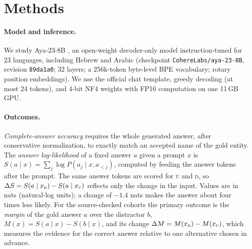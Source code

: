 \documentclass[11pt]{article}
\newcommand{\U}{\textsc{u}}
\newcommand{\D}{\textsc{d}}
\begin{document}
\section{Methods}
\label{sec:methods}

\paragraph{Model and inference.}
We study Aya-23-8B \citep{aryabumi-etal-2024-aya23}, an open-weight decoder-only
model instruction-tuned for 23 languages, including Hebrew and Arabic
(checkpoint \texttt{CohereLabs/aya-23-8B}, revision \texttt{89da1a0}; 32 layers;
a 256k-token byte-level BPE vocabulary; rotary position embeddings). We use the official chat template, greedy decoding (at most 24 tokens), and 4-bit NF4 weights with FP16 computation
\citep{dettmers-etal-2023-qlora} on one 11\,GB GPU.

\paragraph{Outcomes.}
\emph{Complete-answer accuracy} requires the whole generated answer, after
conservative normalization, to exactly match an accepted name of the gold
entity. The
\emph{answer log-likelihood} of a fixed answer $a$ given a prompt $x$ is
$S(a\mid x)=\sum_{j}\log P(a_j\mid x,a_{<j})$, computed by feeding the answer
tokens after the prompt. The same answer tokens are scored for \U{} and \D{}, so
$\Delta S=S(a\mid x_\D)-S(a\mid x_\U)$ reflects only the change in the input.
Values are in nats (natural-log units); a change of $-1.4$ nats makes the answer
about four times less likely. For the source-checked cohorts the primary outcome
is the \emph{margin} of the gold answer $a$ over the distractor $b$,
$M(x)=S(a\mid x)-S(b\mid x)$, and its change $\Delta M=M(x_\D)-M(x_\U)$, which
measures the evidence for the correct answer relative to one alternative chosen
in advance.
\end{document}

